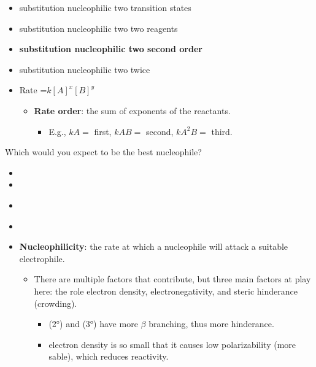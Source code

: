 \documentclass[12pt,a4paper]{article}
\begin{document}
\begin{enumerate}
{    \begin{itemize}
        \item substitution nucleophilic two transition states
        \item substitution nucleophilic two two reagents
        \item {\color{o-Sun}\textbf{substitution nucleophilic two second order}}
        \item substitution nucleophilic two twice
    \end{itemize}
    }
    \begin{itemize}
        \item Rate =\(k[A]^x[B]^y\)
            \begin{itemize}
                \item \textbf{Rate order}: the sum of exponents of the reactants.
                \begin{itemize}
                    \item E.g., \(kA=\) first, \(kAB=\) second, \(kA^2B=\) third.
                \end{itemize}
            \end{itemize}
    \end{itemize}
    {\color{G-Moon}\item Which would you expect to be the best nucleophile?
    \begin{itemize}
        \item {}
        \item {}
        \item {\color{o-Sun}\textbf{}}
        \item {}
    \end{itemize}
    }
    \begin{itemize}
        \item \textbf{Nucleophilicity}: the rate at which a nucleophile will attack a suitable electrophile.
        \begin{itemize}
            \item There are multiple factors that contribute, but three main factors at play here: the role electron density, electronegativity, and steric hinderance (crowding). 
                \begin{itemize}
                    \item {} (\ang{2}) and  (\ang{3}) have more $\beta$ branching, thus more hinderance.
                    \item {} electron density is so small that it causes low polarizability (more sable), which reduces reactivity.

\end{itemize}
\end{itemize}
\end{itemize}
\end{enumerate}
\end{document}
